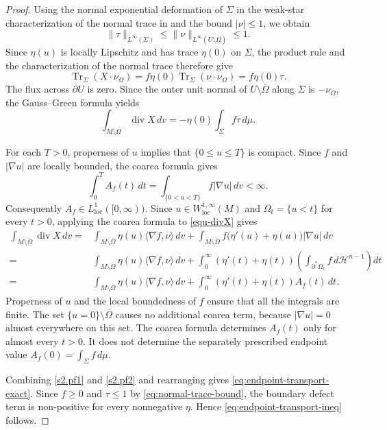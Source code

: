 \documentclass[10pt,a4paper]{amsart}
\numberwithin{equation}{section}
\newcommand{\dd}{\,d}
\newcommand{\diver}{\operatorname{div}}
\begin{document}
\begin{proof}
Using the normal exponential deformation of $\Sigma$ in the weak-star characterization of the normal
trace in \cite[Theorem~2.2(iii)]{ChenFrid1999} and the bound
$|\nu|\leq1$, we obtain
\begin{equation}\label{eq:normal-trace-bound}
    \|\tau\|_{L^\infty(\Sigma)}
    \leq
    \|\nu\|_{L^\infty(U\setminus\overline\Omega)}
    \leq1.
\end{equation}
Since $\eta(u)$ is locally Lipschitz and has trace
$\eta(0)$ on $\Sigma$, the product rule and the characterization of the normal trace therefore give
\begin{equation*}
    \operatorname{Tr}_\Sigma(X\cdot\nu_\Omega)
    =
    f\eta(0)\operatorname{Tr}_\Sigma(\nu\cdot\nu_\Omega)
    =
    f\eta(0)\tau.
\end{equation*} 
The flux across $\partial U$ is zero.  Since the outer unit normal of $U\setminus\overline\Omega$ along $\Sigma$ is $-\nu_\Omega$, the Gauss--Green formula yields
\begin{equation}\label{s2.pf1}
    \int_{M\setminus\overline\Omega}\diver X\,dv
    =-\eta(0)\int_\Sigma f\tau\,d\mu.
\end{equation}

For each $T>0$, properness of $u$ implies that $\{0\leq u\leq T\}$ is compact. Since $f$ and $|\nabla u|$ are locally bounded, the coarea formula gives
\begin{equation*}
    \int_0^T A_f(t) \dd t = \int_{\{0<u<T\}} f |\nabla u| \dd v<\infty.
\end{equation*}
Consequently $A_f\in L_{\mathrm{loc}}^1([0,\infty))$. Since $u\in W_{\mathrm{loc}}^{1,\infty}(M)$ and
$\Omega_t=\{u<t\}$ for every $t>0$, applying the coarea formula to \eqref{equ-divX} gives
\begin{align}\label{s2.pf2}
 \int_{M\setminus\overline\Omega}\diver X\,dv
   =&  \int_{M\setminus\overline\Omega}\eta(u)\langle\nabla f,\nu\rangle \,dv+
    \int_{M\setminus\overline\Omega}
        f\bigl(\eta'(u)+\eta(u)\bigr)|\nabla u|\,dv\nonumber\\
    =&\int_{M\setminus\overline\Omega}\eta(u)\langle\nabla f,\nu\rangle \,dv+
    \int_0^\infty
        (\eta'(t)+\eta(t))
        \left(
            \int_{\partial^*\Omega_t}
                f\,d\mathcal H^{n-1}
        \right)dt \nonumber\\
    =&\int_{M\setminus\overline\Omega}\eta(u)\langle\nabla f,\nu\rangle \,dv+
    \int_0^\infty
        (\eta'(t)+\eta(t))A_f(t)\,dt.
\end{align}
Properness of $u$ and the local boundedness of $f$ ensure that all the integrals are finite. The set $\{u=0\}\setminus\overline\Omega$ causes no additional coarea term, because $|\nabla u|=0$ almost everywhere on this set. The coarea formula determines $A_f(t)$ only for almost every $t>0$. It does not determine the separately prescribed endpoint value $A_f(0)=\int_\Sigma f\,d\mu$.

Combining \eqref{s2.pf1} and \eqref{s2.pf2} and rearranging gives \eqref{eq:endpoint-transport-exact}.  Since $f\geq0$ and $\tau\leq1$ by \eqref{eq:normal-trace-bound}, the boundary defect term is non-positive
for every nonnegative $\eta$.  Hence
\eqref{eq:endpoint-transport-ineq} follows.
\end{proof}
\end{document}

